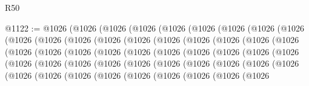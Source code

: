 \begin{lexlean}{R50}
\begin{coremodule}
@1122 := @1026
    (@1026
      (@1026
        (@1026
          (@1026
            (@1026
              (@1026
                (@1026
                  (@1026
                    (@1026
                      (@1026
                        (@1026
                          (@1026
                            (@1026
                              (@1026
                                (@1026
                                  (@1026
                                    (@1026
                                      (@1026
                                        (@1026
                                          (@1026
                                            (@1026
                                              (@1026
                                                (@1026
                                                  (@1026
                                                    (@1026
                                                      (@1026
                                                        (@1026
                                                          (@1026
                                                            (@1026
                                                              (@1026
                                                                (@1026
                                                                  (@1026
                                                                    (@1026
                                                                      (@1026
                                                                        (@1026
                                                                          (@1026
                                                                            (@1026
                                                                              (@1026
                                                                                (@1026
                                                                                  (@1026
                                                                                    (@1026
                                                                                      (@1026
                                                                                        (@1026
                                                                                          (@1026
                                                                                            (@1026
                                                                                              (@1026
                                                                                                (@1026

\end{coremodule}
\end{lexlean}
